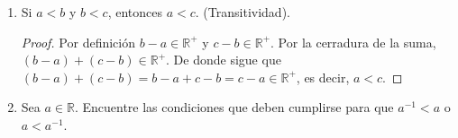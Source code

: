 \documentclass[11pt]{article}
\newcommand{\R}{\mathbb{R}}
\begin{document}
\begin{enumerate}[label=\alph*)]
    \item Si $a<b$ y $b<c$, entonces $a<c$. (Transitividad).
    \vspace{-1em}\begin{proof} 
        Por definición $b-a \in \R^+$ y $c-b \in \R^+$. Por la cerradura de la suma, $(b-a) + (c-b) \in \R^+$. De donde sigue que $(b-a)+(c-b)=b-a+c-b=c-a\in \R^+$, es decir, $a<c$.
    \end{proof} \vspace{-1em}

    \item Sea $a\in \R$. Encuentre las condiciones que deben cumplirse para que $a^{-1}<a$ o $a<a^{-1}$.
    

\end{enumerate}
\end{document}
